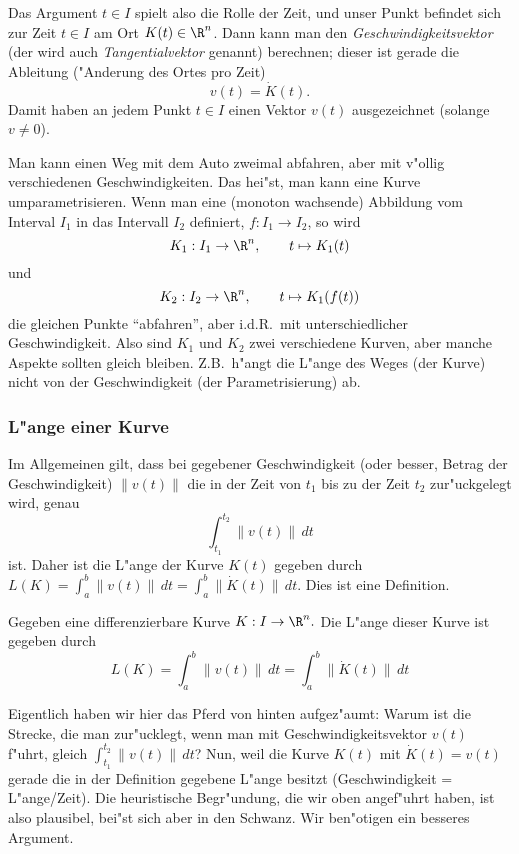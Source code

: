 Das Argument $t\in I$ spielt also die Rolle der Zeit, und unser Punkt befindet 
sich zur Zeit $t\in I$ am Ort $K(t)\in\R^n$. Dann kann man
den \emph{Geschwindigkeitsvektor} (der wird auch \emph{Tangentialvektor} genannt) 
berechnen; dieser ist gerade die Ableitung ("Anderung des Ortes pro Zeit)
$$ v(t) = \dot K(t).$$
Damit haben an jedem Punkt $t\in I$ einen  Vektor $v(t)$ ausgezeichnet (solange $v\not = 0$).

\begin{sbem} Man kann einen Weg mit dem Auto zweimal abfahren, aber mit v"ollig verschiedenen Geschwindigkeiten.
Das hei"st, man kann eine Kurve umparametrisieren. Wenn man eine (monoton wachsende) Abbildung 
vom Interval $I_1$ in das Intervall $I_2$ definiert, $f:I_1\rightarrow I_2$, so wird
$$ K_1: I_1 \rightarrow \R^n,\qquad t\mapsto K_1(t)$$
und
$$ K_2: I_2 \rightarrow \R^n,\qquad t\mapsto K_1(f(t))$$
die gleichen Punkte ``abfahren'', aber i.d.R.\ mit unterschiedlicher Geschwindigkeit. 
Also sind $K_1$ und $K_2$ zwei verschiedene Kurven, aber manche Aspekte sollten gleich bleiben. 
Z.B.\ h"angt die L"ange des Weges (der Kurve) nicht von der Geschwindigkeit (der Parametrisierung) 
ab.
\end{sbem}
\subsubsection{L"ange einer Kurve}
Im Allgemeinen gilt, dass bei gegebener Geschwindigkeit (oder besser, Betrag der Geschwindigkeit) 
$\|v(t)\|$ die in der Zeit von $t_1$ bis zu der Zeit $t_2$ zur"uckgelegt wird, genau
$$ \int _{t_1}^{t_2}\|v(t)\|\, dt$$
ist. Daher ist die L"ange der Kurve $K(t)$ gegeben durch
$ L(K) = \int _{a}^{b}\|v(t)\|\, dt = \int_a^b \|\dot K(t)\|\, dt$. Dies ist eine Definition.

\begin{sdefi} Gegeben eine differenzierbare Kurve $ K: I\rightarrow \R^n.$ Die L"ange dieser Kurve ist gegeben durch 
$$ L(K) = \int _{a}^{b}\|v(t)\|\, dt = \int_a^b \|\dot K(t)\|\, dt$$
\end{sdefi}

\begin{sbem}
Eigentlich haben wir hier das Pferd von hinten aufgez"aumt: Warum ist die Strecke,
die man zur"ucklegt, wenn man mit Geschwindigkeitsvektor $v(t)$ f"uhrt, gleich
$\int_{t_1}^{t_2}\|v(t)\|\, dt$? Nun, weil die Kurve $K(t)$ mit $\dot K(t)=v(t)$ gerade 
die in der Definition gegebene L"ange besitzt (Geschwindigkeit = L"ange/Zeit). 
Die heuristische Begr"undung, die wir oben angef"uhrt haben, ist also plausibel, bei"st sich aber
in den Schwanz. Wir ben"otigen ein besseres Argument. 
\end{sbem}

